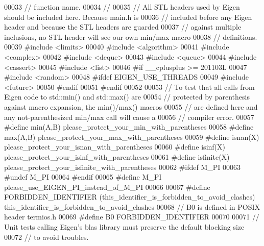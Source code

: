\begin{DoxyCode}
00033 \textcolor{comment}{// function name.}
00034 \textcolor{comment}{//}
00035 \textcolor{comment}{// All STL headers used by Eigen should be included here.  Because main.h is}
00036 \textcolor{comment}{// included before any Eigen header and because the STL headers are guarded}
00037 \textcolor{comment}{// against multiple inclusions, no STL header will see our own min/max macro}
00038 \textcolor{comment}{// definitions.}
00039 \textcolor{preprocessor}{#include <limits>}
00040 \textcolor{preprocessor}{#include <algorithm>}
00041 \textcolor{preprocessor}{#include <complex>}
00042 \textcolor{preprocessor}{#include <deque>}
00043 \textcolor{preprocessor}{#include <queue>}
00044 \textcolor{preprocessor}{#include <cassert>}
00045 \textcolor{preprocessor}{#include <list>}
00046 \textcolor{preprocessor}{#if \_\_cplusplus >= 201103L}
00047 \textcolor{preprocessor}{#include <random>}
00048 \textcolor{preprocessor}{#ifdef EIGEN\_USE\_THREADS}
00049 \textcolor{preprocessor}{#include <future>}
00050 \textcolor{preprocessor}{#endif}
00051 \textcolor{preprocessor}{#endif}
00052 
00053 \textcolor{comment}{// To test that all calls from Eigen code to std::min() and std::max() are}
00054 \textcolor{comment}{// protected by parenthesis against macro expansion, the min()/max() macros}
00055 \textcolor{comment}{// are defined here and any not-parenthesized min/max call will cause a}
00056 \textcolor{comment}{// compiler error.}
00057 \textcolor{preprocessor}{#define min(A,B) please\_protect\_your\_min\_with\_parentheses}
00058 \textcolor{preprocessor}{#define max(A,B) please\_protect\_your\_max\_with\_parentheses}
00059 \textcolor{preprocessor}{#define isnan(X) please\_protect\_your\_isnan\_with\_parentheses}
00060 \textcolor{preprocessor}{#define isinf(X) please\_protect\_your\_isinf\_with\_parentheses}
00061 \textcolor{preprocessor}{#define isfinite(X) please\_protect\_your\_isfinite\_with\_parentheses}
00062 \textcolor{preprocessor}{#ifdef M\_PI}
00063 \textcolor{preprocessor}{#undef M\_PI}
00064 \textcolor{preprocessor}{#endif}
00065 \textcolor{preprocessor}{#define M\_PI please\_use\_EIGEN\_PI\_instead\_of\_M\_PI}
00066 
00067 \textcolor{preprocessor}{#define FORBIDDEN\_IDENTIFIER (this\_identifier\_is\_forbidden\_to\_avoid\_clashes)
       this\_identifier\_is\_forbidden\_to\_avoid\_clashes}
00068 \textcolor{comment}{// B0 is defined in POSIX header termios.h}
00069 \textcolor{preprocessor}{#define B0 FORBIDDEN\_IDENTIFIER}
00070 
00071 \textcolor{comment}{// Unit tests calling Eigen's blas library must preserve the default blocking size}
00072 \textcolor{comment}{// to avoid troubles.}

\end{DoxyCode}
